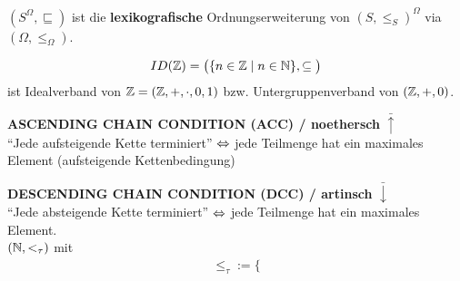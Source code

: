 \begin{bemerkung}
$(S^\Omega,\sqsubseteq)$ ist die \textbf{lexikografische} Ordnungserweiterung von $(S,\leq_S)^\Omega$ via $(\Omega,\leq_\Omega)$.
\end{bemerkung}


\begin{align*}
ID(\mathbb{Z})=\big(\lbrace n\in\mathbb{Z}\mid n\in\mathbb{N}\rbrace,\subseteq\big)
\end{align*}
ist Idealverband von $\mathbb{Z}=(\mathbb{Z},+,\cdot,0,1)$ bzw. Untergruppenverband von $(\mathbb{Z},+,0)$.

\textbf{ASCENDING CHAIN CONDITION (ACC) / noethersch} $\bar{\uparrow}$\\
``Jede aufsteigende Kette terminiert'' $\Leftrightarrow$ jede Teilmenge hat ein maximales Element (aufsteigende Kettenbedingung)

\textbf{DESCENDING CHAIN CONDITION (DCC) / artinsch} $\bar{\downarrow}$\\
``Jede absteigende Kette terminiert'' $\Leftrightarrow$ jede Teilmenge hat ein maximales Element.\\
$(\mathbb{N},<_\tau)$ mit
\begin{align*}
\leq_\tau:=\big\lbrace %
\end{align*}


